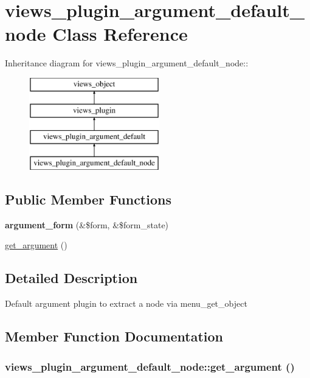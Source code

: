\hypertarget{classviews__plugin__argument__default__node}{
\section{views\_\-plugin\_\-argument\_\-default\_\-node Class Reference}
\label{classviews__plugin__argument__default__node}
}
Inheritance diagram for views\_\-plugin\_\-argument\_\-default\_\-node::\begin{figure}[H]
\begin{center}
\leavevmode
\includegraphics[height=4cm]{classviews__plugin__argument__default__node}
\end{center}
\end{figure}
\subsection*{Public Member Functions}
\begin{CompactItemize}
\item 
\hypertarget{classviews__plugin__argument__default__node_a17f781290869d43f0fc50cbe0d5bb90}{
\textbf{argument\_\-form} (\&\$form, \&\$form\_\-state)}
\label{classviews__plugin__argument__default__node_a17f781290869d43f0fc50cbe0d5bb90}

\item 
\hyperlink{classviews__plugin__argument__default__node_1191e03f5150b371f2fc5911726a4b60}{get\_\-argument} ()
\end{CompactItemize}


\subsection{Detailed Description}
Default argument plugin to extract a node via menu\_\-get\_\-object 

\subsection{Member Function Documentation}
\hypertarget{classviews__plugin__argument__default__node_1191e03f5150b371f2fc5911726a4b60}{
\subsubsection[{get\_\-argument}]{\setlength{\rightskip}{0pt plus 5cm}views\_\-plugin\_\-argument\_\-default\_\-node::get\_\-argument ()}}
\label{classviews__plugin__argument__default__node_1191e03f5150b371f2fc5911726a4b60}


